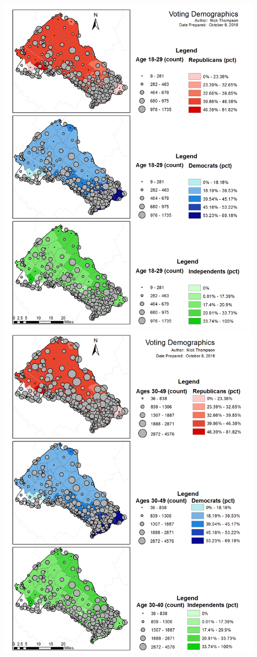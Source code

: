 \documentclass[]{article}
\begin{document}
\includegraphics{question_3a.png} \includegraphics{question_3b.png}
\end{document}

